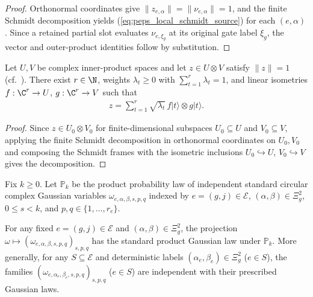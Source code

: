 \begin{proof}\leanok
    Orthonormal coordinates give $\|z_{e,\alpha}\|=\|\nu_{e,\alpha}\|=1$, and the finite Schmidt decomposition yields (\ref{eq:peps_local_schmidt_source}) for each $(e,\alpha)$. Since a retained partial slot evaluates $\nu_{e,\xi_g}$ at its original gate label $\xi_g$, the vector and outer-product identities follow by substitution.
\end{proof}

\begin{lemma}
    \label{thm:peps_tensor_schmidt_isometries}
    \leanok
    Let $U,V$ be complex inner-product spaces and let
    $z\in U\otimes V$ satisfy $\|z\|=1$
    (cf.~\cite[Proposition~1.1]{Wolf2012Quantum}). There exist $r\in\N$, weights $\lambda_t\ge 0$ with $\sum_{t=1}^r\lambda_t=1$, and linear isometries $f:\C^r\to U$, $g:\C^r\to V$ such that
    \begin{align}
        z=\sum_{t=1}^{r}\sqrt{\lambda_t}\,f|t\rangle\otimes g|t\rangle.
    \end{align}
\end{lemma}

\begin{proof}\leanok
    Since $z\in U_0\otimes V_0$ for finite-dimensional subspaces $U_0\subseteq U$ and $V_0\subseteq V$, applying the finite Schmidt decomposition in orthonormal coordinates on $U_0,V_0$ and composing the Schmidt frames with the isometric inclusions $U_0\hookrightarrow U$, $V_0\hookrightarrow V$ gives the decomposition.
\end{proof}

\begin{definition}
    \label{def:peps_source_gaussian_law}
    \leanok
    Fix $k\geq0$. Let $\mathbb P_k$ be the product probability law of independent standard circular complex Gaussian variables $\omega_{e,\alpha,\beta,s,p,q}$ indexed by $e=(g,j)\in\mathcal E$, $(\alpha,\beta)\in\Xi_g^2$, $0\leq s<k$, and $p,q\in\{1,\ldots,r_e\}$.
\end{definition}

\begin{lemma}
    \label{thm:peps_source_gaussian_selection}
    \leanok
    For any fixed $e=(g,j)\in\mathcal E$ and $(\alpha,\beta)\in\Xi_g^2$, the projection $\omega\mapsto(\omega_{e,\alpha,\beta,s,p,q})_{s,p,q}$ has the standard product Gaussian law under $\mathbb P_k$. More generally, for any $S\subseteq\mathcal E$ and deterministic labels $(\alpha_e,\beta_e)\in\Xi_g^2$ ($e\in S$), the families $(\omega_{e,\alpha_e,\beta_e,s,p,q})_{s,p,q}$ ($e\in S$) are independent with their prescribed Gaussian laws.
\end{lemma}

